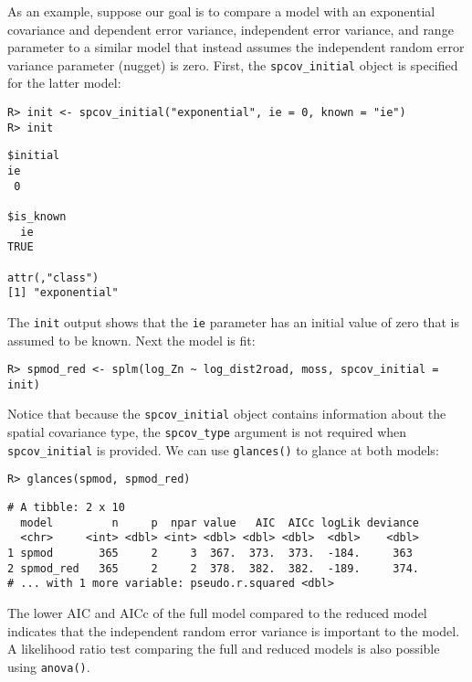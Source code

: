 \documentclass[10pt,letterpaper]{article}
\begin{document}
As an example, suppose our goal is to compare a model with an
exponential covariance and dependent error variance, independent error
variance, and range parameter to a similar model that instead assumes
the independent random error variance parameter (nugget) is zero. First,
the \texttt{spcov\_initial} object is specified for the latter model:

\begin{verbatim}
R> init <- spcov_initial("exponential", ie = 0, known = "ie")
R> init
\end{verbatim}

\begin{verbatim}
$initial
ie 
 0 

$is_known
  ie 
TRUE 

attr(,"class")
[1] "exponential"
\end{verbatim}

\noindent The \texttt{init} output shows that the \texttt{ie} parameter
has an initial value of zero that is assumed to be known. Next the model
is fit:

\begin{verbatim}
R> spmod_red <- splm(log_Zn ~ log_dist2road, moss, spcov_initial = init)
\end{verbatim}

\noindent Notice that because the \texttt{spcov\_initial} object
contains information about the spatial covariance type, the
\texttt{spcov\_type} argument is not required when
\texttt{spcov\_initial} is provided. We can use \texttt{glances()} to
glance at both models:

\begin{verbatim}
R> glances(spmod, spmod_red)
\end{verbatim}

\begin{verbatim}
# A tibble: 2 x 10
  model         n     p  npar value   AIC  AICc logLik deviance
  <chr>     <int> <dbl> <int> <dbl> <dbl> <dbl>  <dbl>    <dbl>
1 spmod       365     2     3  367.  373.  373.  -184.     363 
2 spmod_red   365     2     2  378.  382.  382.  -189.     374.
# ... with 1 more variable: pseudo.r.squared <dbl>
\end{verbatim}

The lower AIC and AICc of the full model compared to the reduced model
indicates that the independent random error variance is important to the
model. A likelihood ratio test comparing the full and reduced models is
also possible using \texttt{anova()}.
\end{document}
